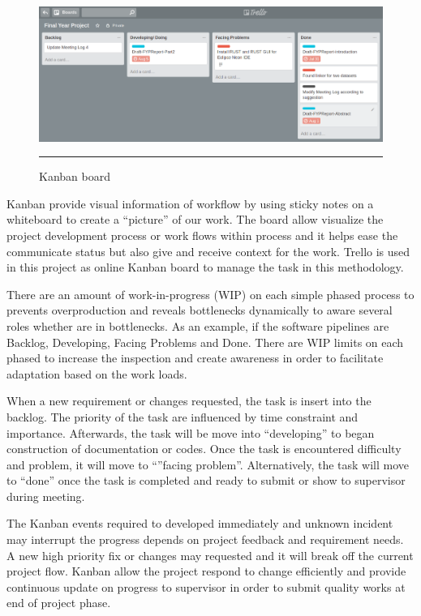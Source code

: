 \begin{figure}[H]
	\centering
	\includegraphics[width=1.0\textwidth]{Figure/kanban.png}
	\rule{35em}{0.5pt}
	\caption[Kanban board]{Kanban board}
\end{figure}

Kanban provide visual information of workflow by using sticky notes on a whiteboard to create a “picture” of our work. The board allow visualize the project development process or work flows within process and it helps ease the communicate status but also give and receive context for the work. Trello is used in this project as online Kanban board to manage the task in this methodology. 

There are an amount of work-in-progress (WIP) on each simple phased process to prevents overproduction and reveals bottlenecks dynamically to aware several roles whether are in bottlenecks. As an example, if the software pipelines are Backlog, Developing, Facing Problems and Done. There are WIP limits on each phased to increase the inspection and create awareness in order to facilitate adaptation based on the work loads. 

When a new requirement or changes requested, the task is insert into the backlog. The priority of the task are influenced by time constraint and importance. Afterwards, the task will be move into “developing” to began construction of documentation or codes. Once the task is encountered difficulty and problem, it will move to “”facing problem”. Alternatively, the task will move to “done” once the task is completed and ready to submit or show to supervisor during meeting. 

The Kanban events required to developed immediately and unknown incident may interrupt the progress depends on project feedback and requirement needs. A new high priority fix or changes may requested and it will break off the current project flow. Kanban allow the project respond to change efficiently and provide continuous update on progress to supervisor in order to submit quality works at end of project phase.  


